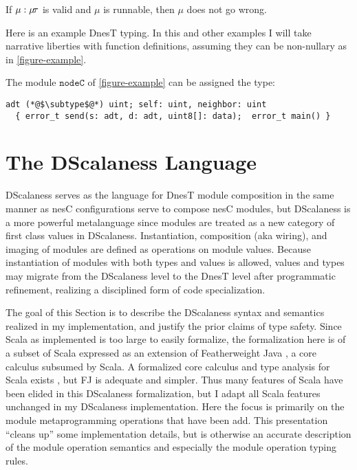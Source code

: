 \declmodtypingfig

\begin{conject}
  If $\mu : \mu\!\tau$ is valid and $\mu$ is runnable, then $\mu$ does not go wrong.
\end{conject}
Here is an example DnesT typing. In this and other examples I will take narrative liberties with
function definitions, assuming they can be non-nullary as in \autoref{figure-example}.
\begin{example}
\label{example-nesttyping}
The module $\texttt{nodeC}$ of \autoref{figure-example} can be assigned the type:
\singlespace
\lstset{numbers=none, basicstyle=\ttfamily} 
\begin{lstlisting}
adt (*@$\subtype$@*) uint; self: uint, neighbor: uint
  { error_t send(s: adt, d: adt, uint8[]: data);  error_t main() }
\end{lstlisting}
\primaryspacing
\end{example}


\section{The DScalaness Language}
\label{section-scalaness-theory}

DScalaness serves as the language for DnesT module composition in the same manner as nesC
configurations serve to compose nesC modules, but DScalaness is a more powerful metalanguage
since modules are treated as a new category of first class values in DScalaness. Instantiation,
composition (aka wiring), and imaging of modules are defined as operations on module values.
Because instantiation of modules with both types and values is allowed, values and types may
migrate from the DScalaness level to the DnesT level after programmatic refinement, realizing a
disciplined form of code specialization.

The goal of this Section is to describe the DScalaness syntax and semantics realized in my
implementation, and justify the prior claims of type safety. Since Scala as implemented is too
large to easily formalize, the formalization here is of a subset of Scala expressed as an
extension of Featherweight Java \cite{FJ}, a core calculus subsumed by Scala. A formalized core
calculus and type analysis for Scala exists \cite{Cremet:2006:CCS:2135978.2135980}, but FJ is
adequate and simpler. Thus many features of Scala have been elided in this DScalaness
formalization, but I adapt all Scala features unchanged in my DScalaness implementation. Here the
focus is primarily on the module metaprogramming operations that have been add. This
presentation ``cleans up'' some implementation details, but is otherwise an accurate description
of the module operation semantics and especially the module operation typing rules.

